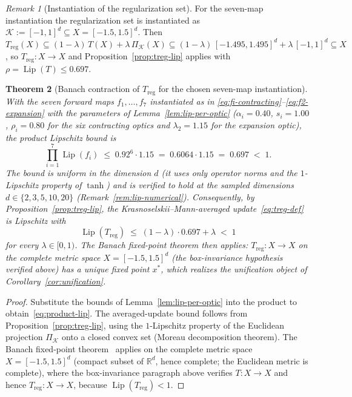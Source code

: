 \documentclass[11pt,a4paper]{article}
\theoremstyle{plain}
\newtheorem{theorem}{Theorem}[section]
\theoremstyle{definition}
\theoremstyle{remark}
\newtheorem{remark}[theorem]{Remark}
\newcommand{\RR}{\mathbb{R}}
\DeclareMathOperator{\Lip}{Lip}
\begin{document}
\begin{remark}[Instantiation of the regularization set]
\label{rem:km-instantiation}
For the seven-map instantiation the regularization set is instantiated
as $\mathcal K:=[-1,1]^{d}\subseteq X=[-1.5,1.5]^{d}$. Then
$T_{\mathrm{reg}}(X)\subseteq (1-\lambda)\,T(X)+\lambda\,
\Pi_{\mathcal K}(X)\subseteq (1-\lambda)\,[-1.495,1.495]^{d}
+\lambda\,[-1,1]^{d}\subseteq X$, so $T_{\mathrm{reg}}:X\to X$ and
Proposition~\ref{prop:treg-lip} applies with
$\rho=\Lip(T)\leq 0.697$.
\end{remark}

\begin{theorem}[Banach contraction of $T_{\mathrm{reg}}$ for the chosen
seven-map instantiation]
\label{thm:unconditional-banach}
With the seven forward maps $f_{1},\ldots,f_{7}$ instantiated as in
\eqref{eq:fi-contracting}--\eqref{eq:f2-expansion} with the
parameters of Lemma~\ref{lem:lip-per-optic}
($\alpha_{i}=0.40$, $s_{i}=1.00$, $\rho_{i}=0.80$ for the six
contracting optics and $\lambda_{2}=1.15$ for the expansion optic),
the product Lipschitz bound is
\begin{equation}\label{eq:product-lip}
  \prod_{i=1}^{7}\Lip(f_{i}) \;\leq\; 0.92^{6}\cdot 1.15
  \;=\; 0.6064\cdot 1.15 \;=\; 0.697 \;<\; 1.
\end{equation}
The bound is uniform in the dimension $d$ (it uses only operator
norms and the $1$-Lipschitz property of $\tanh$) and is verified to
hold at the sampled dimensions $d\in\{2,3,5,10,20\}$
(Remark~\ref{rem:lip-numerical}). Consequently, by
Proposition~\ref{prop:treg-lip}, the Krasnoselskii--Mann-averaged
update~\eqref{eq:treg-def}
is Lipschitz with
\begin{equation}\label{eq:treg-uncond}
  \Lip(T_{\mathrm{reg}}) \;\leq\; (1-\lambda)\cdot 0.697+\lambda
  \;<\; 1
\end{equation}
for every $\lambda\in[0,1)$. The Banach fixed-point theorem then
applies: $T_{\mathrm{reg}}:X\to X$ on the complete metric space
$X=[-1.5,1.5]^{d}$ (the box-invariance hypothesis verified above)
has a unique fixed point $x^{*}$, which realizes the unification
object of Corollary~\ref{cor:unification}.
\end{theorem}

\begin{proof}
Substitute the bounds of Lemma~\ref{lem:lip-per-optic} into the product
to obtain~\eqref{eq:product-lip}. The averaged-update bound
follows from Proposition~\ref{prop:treg-lip}, using the $1$-Lipschitz
property of the Euclidean projection $\Pi_{\mathcal K}$ onto a closed
convex set (Moreau decomposition theorem). The Banach fixed-point
theorem~\cite{banach1922} applies on the complete metric space
$X=[-1.5,1.5]^{d}$ (compact subset of $\RR^{d}$, hence complete; the
Euclidean metric is complete), where the box-invariance paragraph
above verifies $T:X\to X$ and hence $T_{\mathrm{reg}}:X\to X$,
because $\Lip(T_{\mathrm{reg}})<1$.
\end{proof}
\end{document}
